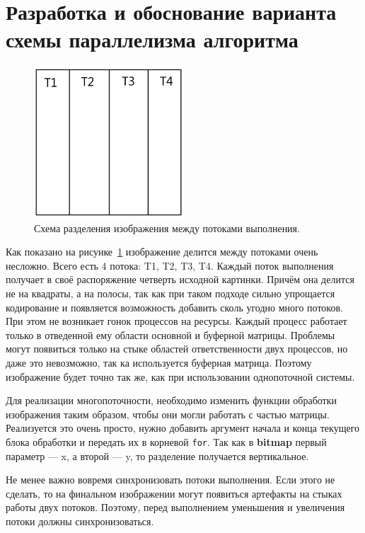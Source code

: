 \newpage


\section{Разработка и обоснование варианта схемы параллелизма алгоритма}\label{sec:devAlgoParallel}
\begin{figure}[h]
    \begin{center}
        \includegraphics[width=0.5\textwidth]{../resources/img}
    \end{center}
    \caption{Схема разделения изображения между потоками выполнения.}
    \label{fig:imageThreads}
\end{figure}

Как показано на рисунке~\ref{fig:imageThreads} изображение делится между потоками очень несложно.
Всего есть 4 потока: T1, T2, T3, T4.
Каждый поток выполнения получает в своё распоряжение четверть исходной картинки.
Причём она делится не на квадраты, а на полосы, так как при таком подходе сильно упрощается кодирование и появляется возможность добавить сколь угодно много потоков.
При этом не возникает гонок процессов на ресурсы.
Каждый процесс работает только в отведенной ему области основной и буферной матрицы.
Проблемы могут появиться только на стыке областей ответственности двух процессов, но даже это невозможно, так ка используется буферная матрица.
Поэтому изображение будет точно так же, как при использовании однопоточной системы.

Для реализации многопоточности, необходимо изменить функции обработки изображения таким образом, чтобы они могли работать с частью матрицы.
Реализуется это очень просто, нужно добавить аргумент начала и конца текущего блока обработки и передать их в корневой \texttt{for}.
Так как в \textbf{bitmap} первый параметр --- x, а второй --- y, то разделение получается вертикальное.

Не менее важно вовремя синхронизовать потоки выполнения.
Если этого не сделать, то на финальном изображении могут появиться артефакты на стыках работы двух потоков.
Поэтому, перед выполнением уменьшения и увеличения потоки должны синхронизоваться.

